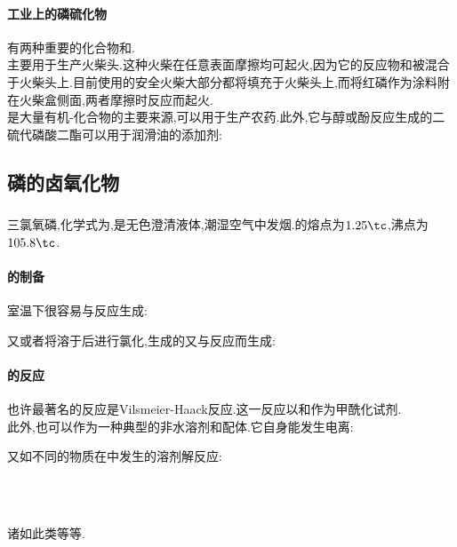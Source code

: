 \documentclass{ctexart}
\begin{document}
\paragraph{工业上的磷硫化物}
有两种重要的化合物和.\\
\indent {}主要用于生产火柴头.这种火柴在任意表面摩擦均可起火,因为它的反应物和被混合于火柴头上.目前使用的安全火柴大部分都将填充于火柴头上,而将红磷作为涂料附在火柴盒侧面,两者摩擦时反应而起火.\\
\indent {}是大量有机-化合物的主要来源,可以用于生产农药.此外,它与醇或酚反应生成的二硫代磷酸二酯可以用于润滑油的添加剂:
\begin{center}
\end{center}
\subsection{磷的卤氧化物}
\subsubsection{}
\begin{substance}[\ce{POCl3}]
    三氯氧磷,化学式为,是无色澄清液体,潮湿空气中发烟.的熔点为$1.25\tc$,沸点为$105.8\tc$.
\end{substance}
\paragraph{的制备}
室温下很容易与反应生成:
\begin{center}
\end{center}
又或者将溶于后进行氯化,生成的又与反应而生成:
\begin{center}
\end{center}
\paragraph{的反应}
也许最著名的反应是Vilsmeier-Haack反应.这一反应以和作为甲酰化试剂.\\
\indent 此外,也可以作为一种典型的非水溶剂和配体.它自身能发生电离:
\begin{center}
\end{center}
又如不同的物质在中发生的溶剂解反应:
\begin{center}
    \\
    \\
\end{center}
诸如此类等等.
\end{document}
